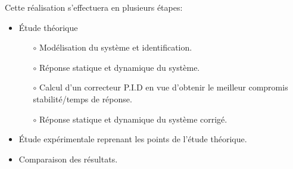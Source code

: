 Cette  réalisation s'effectuera en plusieurs étapes:
\begin{itemize}
	\item Étude théorique
	\begin{itemize}
		\item[$\circ$] Modélisation du système et identification.
		\item[$\circ$] Réponse statique et dynamique du système.
		\item[$\circ$] Calcul d'un correcteur  P.I.D en vue d'obtenir le meilleur compromis stabilité/temps de réponse.
		\item[$\circ$] Réponse statique et dynamique du système corrigé.
	\end{itemize}
	\item Étude expérimentale reprenant les points de l'étude théorique.
	\item Comparaison des résultats. 
\end{itemize}